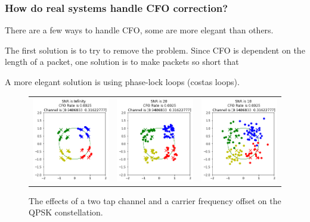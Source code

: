 \subsubsection{How do real systems handle CFO correction?}

There are a few ways to handle CFO, some are more elegant than others. 

The first solution is to try to remove the problem.  Since CFO is dependent on the length of a packet, one solution is to make packets so short that 

A more elegant solution is using phase-lock loops (costas loops).

\setlength{\tabcolsep}{0pt}
\begin{figure}
  \centering
  \label{fig:multi_tap_cfo}\caption{The effects of a two tap channel and a carrier frequency offset on the QPSK constellation.}
  \begin{tabular}{ccc}
    \includegraphics[width=45mm]{figures/cfo_equal_intro/snr_0_c3/cfo_0.png}&
    \includegraphics[width=45mm]{figures/cfo_equal_intro/snr_20_c3/cfo_0.png}&
    \includegraphics[width=45mm]{figures/cfo_equal_intro/snr_10_c3/cfo_0.png}\\

\end{tabular}
\end{figure}
